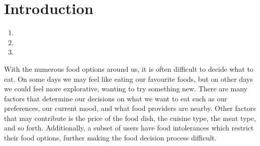 \chapter{Introduction}\label{C:intro}

\begin{enumerate}
 \item {}
 \item {}
 \item {}
\end{enumerate}

With the numerous food options around us, it is often difficult to decide what to eat. On some days we may feel like eating our favourite foods, but on other days we could feel more explorative, wanting to try something new. There are many factors that determine our decisions on what we want to eat such as our preferences, our current mood, and what food providers are nearby. Other factors that may contribute is the price of the food dish, the cuisine type, the meat type, and so forth. Additionally, a subset of users have food intolerances which restrict their food options, further making the food decision process difficult.


